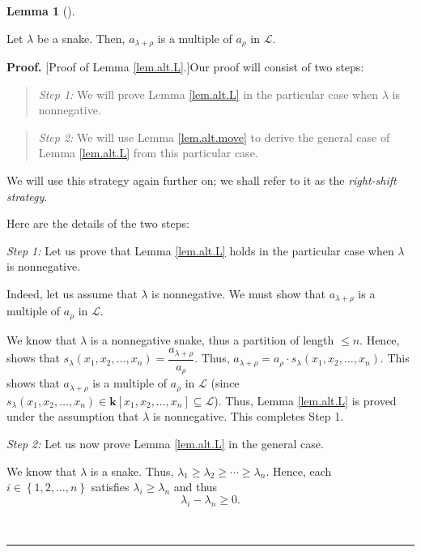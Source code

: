 \documentclass[numbers=enddot,12pt,final,onecolumn,notitlepage]{scrartcl}%
\theoremstyle{definition}
\newtheorem{lem}[theo]{Lemma}
\newenvironment{lemma}[1][]
{\begin{lem}[#1]\begin{leftbar}}
{\end{leftbar}\end{lem}}
\newenvironment{statement}{\begin{quote}}{\end{quote}}
\newenvironment{proof}[1][Proof]{\noindent\textbf{#1.} }{\ \rule{0.5em}{0.5em}}
\begin{document}
\begin{lemma}
\label{lem.alt.L}Let $\lambda$ be a snake. Then, $a_{\lambda+\rho}$ is a
multiple of $a_{\rho}$ in $\mathcal{L}$.
\end{lemma}

\begin{proof}
[Proof of Lemma \ref{lem.alt.L}.]Our proof will consist of two steps:

\begin{statement}
\textit{Step 1:} We will prove Lemma \ref{lem.alt.L} in the particular case
when $\lambda$ is nonnegative.
\end{statement}

\begin{statement}
\textit{Step 2:} We will use Lemma \ref{lem.alt.move} to derive the general
case of Lemma \ref{lem.alt.L} from this particular case.
\end{statement}

We will use this strategy again further on; we shall refer to it as the
\emph{right-shift strategy}.

Here are the details of the two steps:

\textit{Step 1:} Let us prove that Lemma \ref{lem.alt.L} holds in the
particular case when $\lambda$ is nonnegative.

Indeed, let us assume that $\lambda$ is nonnegative. We must show that
$a_{\lambda+\rho}$ is a multiple of $a_{\rho}$ in $\mathcal{L}$.

We know that $\lambda$ is a nonnegative snake, thus a partition of length
$\leq n$. Hence, \cite[Corollary 2.6.7]{GriRei} shows that $s_{\lambda}\left(
x_{1},x_{2},\ldots,x_{n}\right)  =\dfrac{a_{\lambda+\rho}}{a_{\rho}}$. Thus,
$a_{\lambda+\rho}=a_{\rho}\cdot s_{\lambda}\left(  x_{1},x_{2},\ldots
,x_{n}\right)  $. This shows that $a_{\lambda+\rho}$ is a multiple of
$a_{\rho}$ in $\mathcal{L}$ (since $s_{\lambda}\left(  x_{1},x_{2}%
,\ldots,x_{n}\right)  \in\mathbf{k}\left[  x_{1},x_{2},\ldots,x_{n}\right]
\subseteq\mathcal{L}$). Thus, Lemma \ref{lem.alt.L} is proved under the
assumption that $\lambda$ is nonnegative. This completes Step 1.

\textit{Step 2:} Let us now prove Lemma \ref{lem.alt.L} in the general case.

We know that $\lambda$ is a snake. Thus, $\lambda_{1}\geq\lambda_{2}\geq
\cdots\geq\lambda_{n}$. Hence, each $i\in\left\{  1,2,\ldots,n\right\}  $
satisfies $\lambda_{i}\geq\lambda_{n}$ and thus%
\begin{equation}
\lambda_{i}-\lambda_{n}\geq0. \label{pf.lem.alt.L.s2.1}%
\end{equation}



\end{proof}
\end{document}
